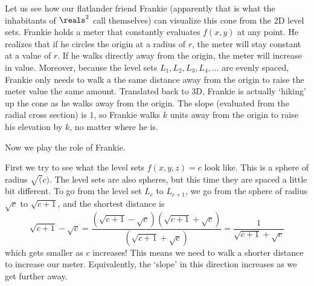 Let us see how our flatlander friend Frankie (apparently that is what the inhabitants of $\reals^2$ call themselves) can visualize this cone from the 2D level sets. Frankie holds a meter that constantly evaluates $f(x,y)$ at any point. He realizes that if he circles the origin at a radius of $r$, the meter will stay constant at a value of $r$. If he walks directly away from the origin, the meter will increase in value. Moreover, because the level sets $L_1,L_2,L_3,L_4,...$ are evenly spaced, Frankie only needs to walk a the same distance away from the origin to raise the meter value the same amount. Translated back to 3D, Frankie is actually `hiking' up the cone as he walks away from the origin. The slope (evaluated from the radial cross section) is $1$, so Frankie walks $k$ units away from the origin to raise his elevation by $k$, no matter where he is.

Now we play the role of Frankie. 

First we try to see what the level sets $f(x,y,z)=c$ look like. This is a sphere of radius $\sqrt(c)$. The level sets are also spheres, but this time they are spaced a little bit different. To go from the level set $L_c$ to $L_{c+1}$, we go from the sphere of radius $\sqrt{c}$ to $\sqrt{c+1}$, and the shortest distance is  \[
    \sqrt{c+1}-\sqrt{c} =  \frac{(\sqrt{c+1}-\sqrt{c})(\sqrt{c+1}+\sqrt{c})}{(\sqrt{c+1}+\sqrt{c})} = \frac{1}{\sqrt{c+1}+\sqrt{c}}
\]
which gets smaller as $c$ increases! This means we need to walk a shorter distance to increase our meter. Equivalently, the `slope' in this direction increases as we get further away.



